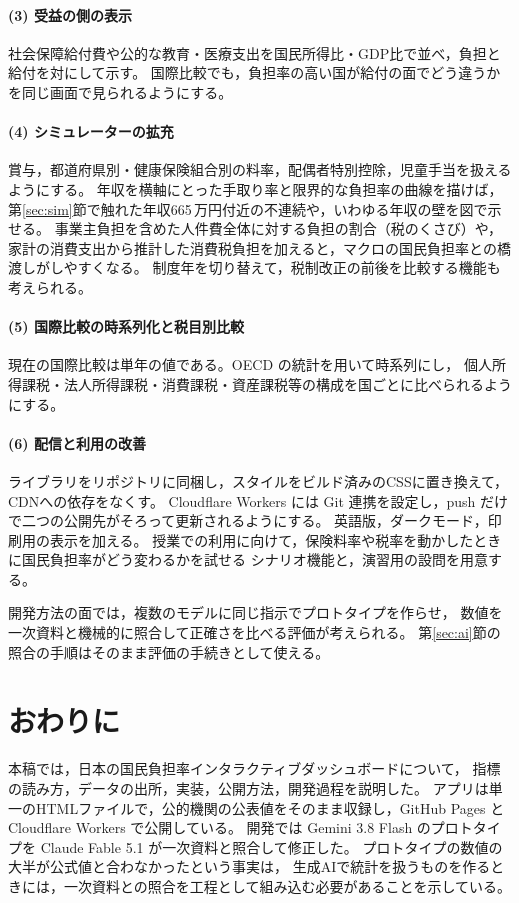 \documentclass[paper=a4,fontsize=10pt]{jlreq}
\newcommand{\man}{\,万円}
\begin{document}
\paragraph{(3) 受益の側の表示}
社会保障給付費や公的な教育・医療支出を国民所得比・GDP比で並べ，負担と給付を対にして示す。
国際比較でも，負担率の高い国が給付の面でどう違うかを同じ画面で見られるようにする。

\paragraph{(4) シミュレーターの拡充}
賞与，都道府県別・健康保険組合別の料率，配偶者特別控除，児童手当を扱えるようにする。
年収を横軸にとった手取り率と限界的な負担率の曲線を描けば，
第\ref{sec:sim}節で触れた年収665\man 付近の不連続や，いわゆる年収の壁を図で示せる。
事業主負担を含めた人件費全体に対する負担の割合（税のくさび）や，
家計の消費支出から推計した消費税負担を加えると，マクロの国民負担率との橋渡しがしやすくなる。
制度年を切り替えて，税制改正の前後を比較する機能も考えられる。

\paragraph{(5) 国際比較の時系列化と税目別比較}
現在の国際比較は単年の値である。OECD の統計を用いて時系列にし，
個人所得課税・法人所得課税・消費課税・資産課税等の構成を国ごとに比べられるようにする。

\paragraph{(6) 配信と利用の改善}
ライブラリをリポジトリに同梱し，スタイルをビルド済みのCSSに置き換えて，CDNへの依存をなくす。
Cloudflare Workers には Git 連携を設定し，push だけで二つの公開先がそろって更新されるようにする。
英語版，ダークモード，印刷用の表示を加える。
授業での利用に向けて，保険料率や税率を動かしたときに国民負担率がどう変わるかを試せる
シナリオ機能と，演習用の設問を用意する。

\medskip
開発方法の面では，複数のモデルに同じ指示でプロトタイプを作らせ，
数値を一次資料と機械的に照合して正確さを比べる評価が考えられる。
第\ref{sec:ai}節の照合の手順はそのまま評価の手続きとして使える。

\section{おわりに}

本稿では，日本の国民負担率インタラクティブダッシュボードについて，
指標の読み方，データの出所，実装，公開方法，開発過程を説明した。
アプリは単一のHTMLファイルで，公的機関の公表値をそのまま収録し，GitHub Pages と Cloudflare Workers で公開している。
開発では Gemini 3.8 Flash のプロトタイプを Claude Fable 5.1 が一次資料と照合して修正した。
プロトタイプの数値の大半が公式値と合わなかったという事実は，
生成AIで統計を扱うものを作るときには，一次資料との照合を工程として組み込む必要があることを示している。
\end{document}
